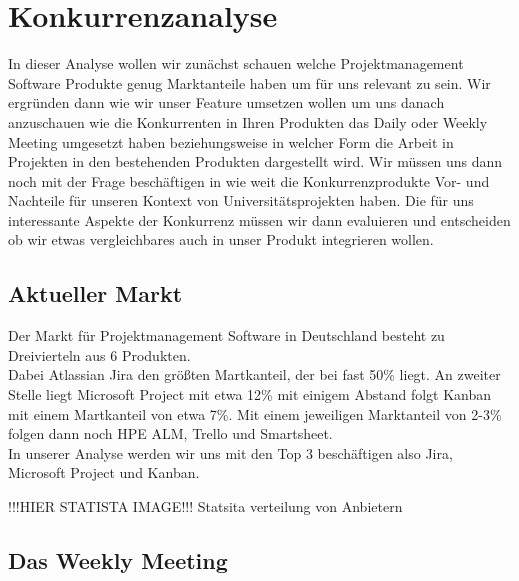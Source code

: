 \chapter{Konkurrenzanalyse}

In dieser Analyse wollen wir zunächst schauen welche Projektmanagement Software Produkte genug Marktanteile haben um für uns relevant zu sein. Wir ergründen dann wie wir unser Feature umsetzen wollen um uns danach anzuschauen wie die Konkurrenten in Ihren Produkten das Daily oder Weekly Meeting umgesetzt haben beziehungsweise in welcher Form die Arbeit in Projekten in den bestehenden Produkten dargestellt wird. Wir müssen uns dann noch mit der Frage beschäftigen in wie weit die Konkurrenzprodukte Vor- und Nachteile für unseren Kontext von Universitätsprojekten haben. Die für uns interessante Aspekte der Konkurrenz müssen wir dann evaluieren und entscheiden ob wir etwas vergleichbares auch in unser Produkt integrieren wollen.

\section{Aktueller Markt}

Der Markt für Projektmanagement Software in Deutschland besteht zu Dreivierteln aus 6 Produkten. \\
Dabei Atlassian Jira den größten Martkanteil, der bei fast 50\% liegt. An zweiter Stelle liegt Microsoft Project mit etwa 12\% mit einigem Abstand folgt Kanban mit einem Martkanteil von etwa 7\%. Mit einem jeweiligen Marktanteil von 2-3\% folgen dann noch HPE ALM, Trello und Smartsheet. \\
In unserer Analyse werden wir uns mit den Top 3 beschäftigen also Jira, Microsoft Project und Kanban. 

!!!HIER STATISTA IMAGE!!!
Statsita verteilung von Anbietern

\section{Das Weekly Meeting}

